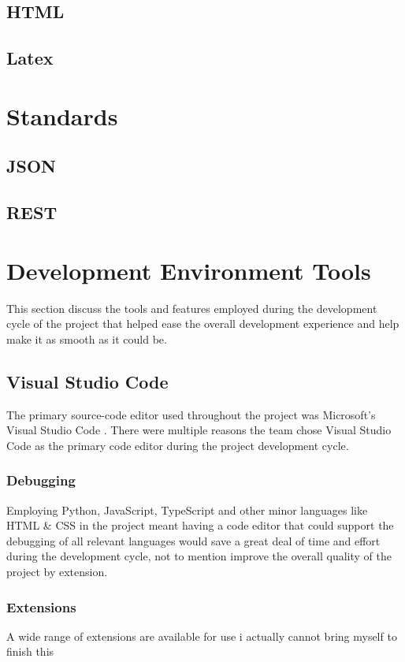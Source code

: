 \subsection{HTML}
\subsection{Latex}

\section{Standards}
\subsection{JSON}
\subsection{REST}

\section{Development Environment Tools}
This section discuss the tools and features employed during the development cycle of the project that helped ease the overall development experience and help make it as smooth as it could be.

\subsection{Visual Studio Code}
The primary source-code editor used throughout the project was Microsoft's Visual Studio Code \cite{VS_CODE}. There were multiple reasons the team chose Visual Studio Code as the primary code editor during the project development cycle.

\subsubsection{Debugging}
Employing Python, JavaScript, TypeScript and other minor languages like HTML \& CSS in the project meant having a code editor that could support the debugging of all relevant languages would save a great deal of time and effort during the development cycle, not to mention improve the overall quality of the project by extension.

\subsubsection{Extensions}
A wide range of extensions are available for use i actually cannot bring myself to finish this

